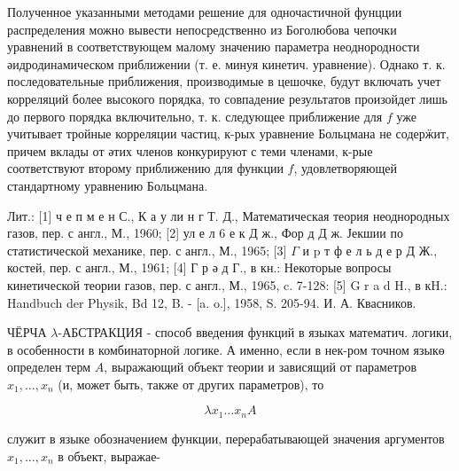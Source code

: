 \documentclass[10pt]{article}
\begin{document}
Полученное указанными методами решение для одночастичной фунцции распределения можно вывести непосредственно из Боголюбова чепочки уравнений в соответствующем малому значению параметра неоднородности әидродинамическом приближении (т. е. минуя кинетич. уравнение). Однако т. к. последовательные приближения, производимые в цешочке, будут включать учет корреляций более высокого порядка, то совпадение результатов произойдет лишь до первого порядка включительно, т. к. следующее приближение для $f$ уже учитывает тройные корреляции частиц, к-рых уравнение Больцмана не содерӝит, причем вклады от әтих членов конкурируют с теми членами, к-рые соответствуют второму приближению для функции $f$, удовлетворяющей стандартному уравнению Больцмана.



Лит.: [1] ч е п м е н С., К а у ли н г Т. Д., Математическая теория неоднородных газов, пер. с англ., М., 1960; [2] ул е л 6 е к Д ж., Фор д Д ж. Јекшии по статистической механике, пер. с англ., М., 1965; [3] $\Gamma$ и $\mathrm{p}$ т ф е л ь д е р Д Ж., костей, пер. с англ., М., 1961; [4] Г р ә д Г., в кн.: Некоторые вопросы кинетической теории газов, пер. с англ., М., 1965, c. 7-128: [5] G r a d H., в кH.: Handbuch der Physik, Bd 12, B. - [a. o.], 1958, S. 205-94. И. А. Квасников.



ЧЁРЧА $\lambda$-АБСТРАКЦИЯ - способ введения функций в языках математич. логики, в особенности в комбинаторной логике. А именно, если в нек-ром точном языкө определен терм $A$, выражающий объект теории и зависящий от параметров $x_{1}, \ldots, x_{n}$ (и, может быть, также от других параметров), то



\[

\lambda x_{1} \ldots x_{n} A

\]



служит в языке обозначением функции, перерабатывающей значения аргументов $x_{1}, \ldots, x_{n}$ в объект, выражае-
\end{document}
